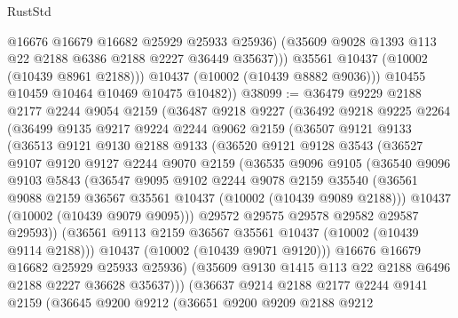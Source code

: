 \begin{lexlean}{RustStd}
\begin{coremodule}
                  @16676
                  @16679
                  @16682
                  @25929
                  @25933
                  @25936)
                (@35609 @9028 @1393 @113 @22 @2188 @6386 @2188 @2227 @36449 @35637)))
            @35561
            @10437
            (@10002 (@10439 @8961 @2188)))
          @10437
          (@10002 (@10439 @8882 @9036)))
        @10455
        @10459
        @10464
        @10469
        @10475
        @10482))
@38099 := @36479
    @9229
    @2188
    @2177
    @2244
    @9054
    @2159
    (@36487
      @9218
      @9227
      (@36492
        @9218
        @9225
        @2264
        (@36499
          @9135
          @9217
          @9224
          @2244
          @9062
          @2159
          (@36507
            @9121
            @9133
            (@36513
              @9121
              @9130
              @2188
              @9133
              (@36520
                @9121
                @9128
                @3543
                (@36527
                  @9107
                  @9120
                  @9127
                  @2244
                  @9070
                  @2159
                  (@36535
                    @9096
                    @9105
                    (@36540
                      @9096
                      @9103
                      @5843
                      (@36547
                        @9095
                        @9102
                        @2244
                        @9078
                        @2159
                        @35540
                        (@36561 @9088 @2159 @36567 @35561 @10437 (@10002 (@10439 @9089 @2188)))
                        @10437
                        (@10002 (@10439 @9079 @9095)))
                      @29572
                      @29575
                      @29578
                      @29582
                      @29587
                      @29593))
                  (@36561 @9113 @2159 @36567 @35561 @10437 (@10002 (@10439 @9114 @2188)))
                  @10437
                  (@10002 (@10439 @9071 @9120)))
                @16676
                @16679
                @16682
                @25929
                @25933
                @25936)
              (@35609 @9130 @1415 @113 @22 @2188 @6496 @2188 @2227 @36628 @35637)))
          (@36637
            @9214
            @2188
            @2177
            @2244
            @9141
            @2159
            (@36645
              @9200
              @9212
              (@36651
                @9200
                @9209
                @2188
                @9212

\end{coremodule}
\end{lexlean}
